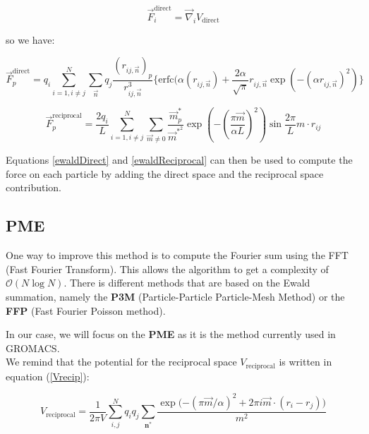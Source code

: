 \documentclass[12pt,twoside,a4paper]{report}
\begin{document}
\begin{equation}
   \overrightarrow{F}_i^{\text{direct}} = \overrightarrow{\nabla}_i V_{\text{direct}} 
\end{equation}


so we have:

\begin{equation}
\label{ewaldDirect}
   \overrightarrow{F}_p^{\text{direct}} = q_i \sum\limits_{i=1,i\neq j}^N \sum\limits_{\vec{n}} q_j \frac{(r_{ij,\vec{n}})_p}{r_{ij,\vec{n}}^3}
   \{\text{erfc}(\alpha (r_{ij,\vec{n}}) + \frac{2\alpha}{\sqrt{\pi}} r_{ij,\vec{n}} \exp(-(\alpha r_{ij,\vec{n}})^2)\}
\end{equation}


\begin{equation}
\label{ewaldReciprocal}
   \overrightarrow{F}_p^{\text{reciprocal}} = \frac{2 q_i}{L} \sum\limits_{i=1,i\neq j}^N \sum_{\vec{m} \neq 0} \frac{\vec{m}_p^*}{\vec{m}^{*^2}} \exp{(-(\frac{\pi \vec{m}}{\alpha L})^2)}\sin{\frac{2\pi}{L} m \cdot r_{ij} }
\end{equation}

Equations \ref{ewaldDirect} and \ref{ewaldReciprocal} can then be used to compute the force on each particle by adding the direct space and the reciprocal space contribution.\\


\subsection{PME}
One way to improve this method is to compute the Fourier sum using the FFT (Fast Fourier Transform). This allows the algorithm to get a complexity of $\mathcal{O}(N\log N)$. There is different methods that are based on the Ewald summation, namely the \textbf{P3M} (Particle-Particle Particle-Mesh Method) or the \textbf{FFP} (Fast Fourier Poisson method). 

In our case, we will focus on the \textbf{PME} as it is the method currently used in GROMACS. \\

We remind that the potential for the reciprocal space $V_{\text{reciprocal}}$ is written in equation (\ref{Vrecip}):


\begin{equation*}
    V_{\text{reciprocal}} =\frac{1}{2 \pi V} \sum\limits_{i,j}^{N} q_i q_j \sum\limits_{\textbf{n}^*} \frac{\exp{(-(\pi \overrightarrow{m}/\alpha)^2} +2\pi i \overrightarrow{m} \cdot (r_i - r_j))}{m^2}    
\end{equation*}
\end{document}
